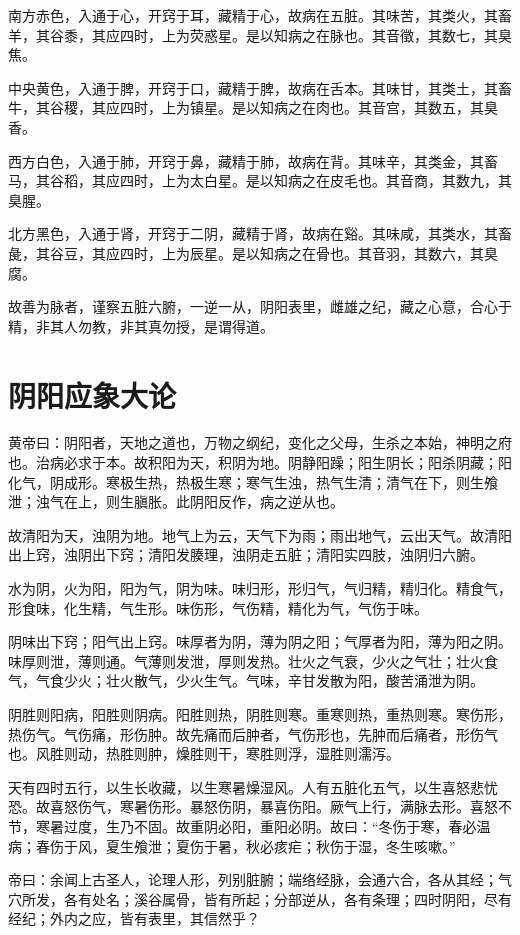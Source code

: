 \documentclass{article}%
\begin{document}
南方赤色，入通于心，开窍于耳，藏精于心，故病在五脏。其味苦，其类火，其畜羊，其谷黍，其应四时，上为荧惑星。是以知病之在脉也。其音徵，其数七，其臭焦。

中央黄色，入通于脾，开窍于口，藏精于脾，故病在舌本。其味甘，其类土，其畜牛，其谷稷，其应四时，上为镇星。是以知病之在肉也。其音宫，其数五，其臭香。

西方白色，入通于肺，开窍于鼻，藏精于肺，故病在背。其味辛，其类金，其畜马，其谷稻，其应四时，上为太白星。是以知病之在皮毛也。其音商，其数九，其臭腥。

北方黑色，入通于肾，开窍于二阴，藏精于肾，故病在谿。其味咸，其类水，其畜彘，其谷豆，其应四时，上为辰星。是以知病之在骨也。其音羽，其数六，其臭腐。

故善为脉者，谨察五脏六腑，一逆一从，阴阳表里，雌雄之纪，藏之心意，合心于精，非其人勿教，非其真勿授，是谓得道。
\section{阴阳应象大论}
黄帝曰：阴阳者，天地之道也，万物之纲纪，变化之父母，生杀之本始，神明之府也。治病必求于本。故积阳为天，积阴为地。阴静阳躁；阳生阴长；阳杀阴藏；阳化气，阴成形。寒极生热，热极生寒；寒气生浊，热气生清；清气在下，则生飧泄；浊气在上，则生䐜胀。此阴阳反作，病之逆从也。

故清阳为天，浊阴为地。地气上为云，天气下为雨；雨出地气，云出天气。故清阳出上窍，浊阴出下窍；清阳发腠理，浊阴走五脏；清阳实四肢，浊阴归六腑。

水为阴，火为阳，阳为气，阴为味。味归形，形归气，气归精，精归化。精食气，形食味，化生精，气生形。味伤形，气伤精，精化为气，气伤于味。

阴味出下窍；阳气出上窍。味厚者为阴，薄为阴之阳；气厚者为阳，薄为阳之阴。味厚则泄，薄则通。气薄则发泄，厚则发热。壮火之气衰，少火之气壮；壮火食气，气食少火；壮火散气，少火生气。气味，辛甘发散为阳，酸苦涌泄为阴。

阴胜则阳病，阳胜则阴病。阳胜则热，阴胜则寒。重寒则热，重热则寒。寒伤形，热伤气。气伤痛，形伤肿。故先痛而后肿者，气伤形也，先肿而后痛者，形伤气也。风胜则动，热胜则肿，燥胜则干，寒胜则浮，湿胜则濡泻。

天有四时五行，以生长收藏，以生寒暑燥湿风。人有五脏化五气，以生喜怒悲忧恐。故喜怒伤气，寒暑伤形。暴怒伤阴，暴喜伤阳。厥气上行，满脉去形。喜怒不节，寒暑过度，生乃不固。故重阴必阳，重阳必阴。故曰：“冬伤于寒，春必温病；春伤于风，夏生飧泄；夏伤于暑，秋必痎疟；秋伤于湿，冬生咳嗽。”

帝曰：余闻上古圣人，论理人形，列别脏腑；端络经脉，会通六合，各从其经；气穴所发，各有处名；溪谷属骨，皆有所起；分部逆从，各有条理；四时阴阳，尽有经纪；外内之应，皆有表里，其信然乎？
\end{document}

